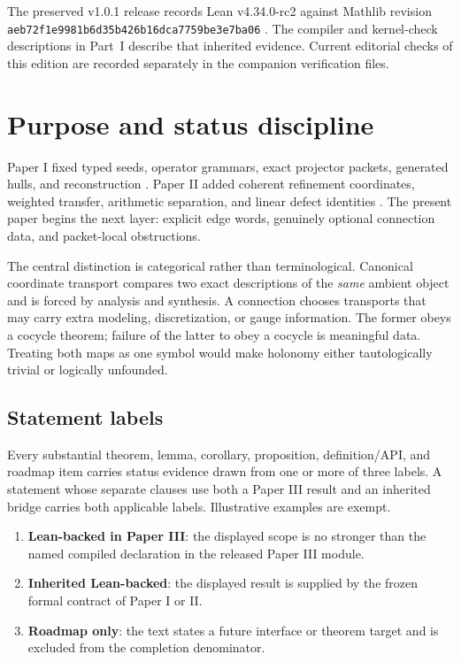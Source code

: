 \documentclass[11pt,a4paper]{article}
\theoremstyle{plain}
\theoremstyle{definition}
\theoremstyle{remark}
\newcommand{\leanname}[1]{\nolinkurl{#1}}
\begin{document}
\medskip\noindent The preserved v1.0.1 release records Lean v4.34.0-rc2 against Mathlib revision \leanname{aeb72f1e9981b6d35b426b16dca7759be3e7ba06} \cite{lean,mathlib}. The compiler and kernel-check descriptions in Part~I describe that inherited evidence. Current editorial checks of this edition are recorded separately in the companion verification files.
\section{Purpose and status discipline}
\label{sec:purpose}

Paper I fixed typed seeds, operator grammars, exact projector packets,
generated hulls, and reconstruction \cite{paperI}.  Paper II added coherent
refinement coordinates, weighted transfer, arithmetic separation, and linear
defect identities \cite{paperII}.  The present paper begins the next layer:
explicit edge words, genuinely optional connection data, and packet-local
obstructions.

The central distinction is categorical rather than terminological.
Canonical coordinate transport compares two exact descriptions of the
\emph{same} ambient object and is forced by analysis and synthesis.  A
connection chooses transports that may carry extra modeling, discretization,
or gauge information.  The former obeys a cocycle theorem; failure of the
latter to obey a cocycle is meaningful data.  Treating both maps as one
symbol would make holonomy either tautologically trivial or logically
unfounded.

\subsection{Statement labels}

Every substantial theorem, lemma, corollary, proposition, definition/API, and
roadmap item carries status evidence drawn from one or more of three labels.
A statement
whose separate clauses use both a Paper III result and an inherited bridge
carries both applicable labels.  Illustrative examples are exempt.
\begin{enumerate}[label=\textbf{S\arabic*.},leftmargin=3.2em]
\item \textbf{Lean-backed in Paper III}: the displayed scope is no stronger
than the named compiled declaration in the released Paper III module.
\item \textbf{Inherited Lean-backed}: the displayed result is supplied by the
frozen formal contract of Paper I or II.
\item \textbf{Roadmap only}: the text states a future interface or theorem
target and is excluded from the completion denominator.
\end{enumerate}
\end{document}
